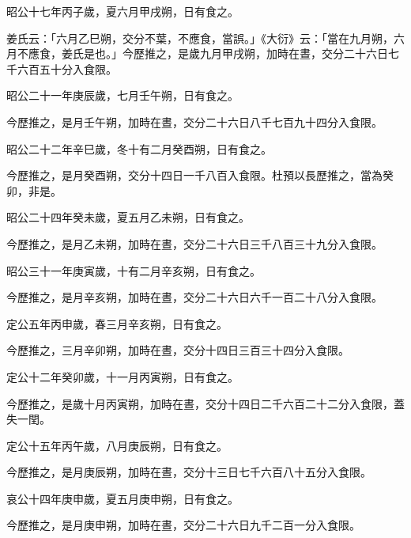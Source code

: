 \begin{pinyinscope}
 昭公十七年丙子歲，夏六月甲戌朔，日有食之。



 姜氏云：「六月乙巳朔，交分不葉，不應食，當誤。」《大衍》云：「當在九月朔，六月不應食，姜氏是也。」今歷推之，是歲九月甲戌朔，加時在晝，交分二十六日七千六百五十分入食限。



 昭公二十一年庚辰歲，七月壬午朔，日有食之。



 今歷推之，是月壬午朔，加時在晝，交分二十六日八千七百九十四分入食限。



 昭公二十二年辛巳歲，冬十有二月癸酉朔，日有食之。



 今歷推之，是月癸酉朔，交分十四日一千八百入食限。杜預以長歷推之，當為癸卯，非是。



 昭公二十四年癸未歲，夏五月乙未朔，日有食之。



 今歷推之，是月乙未朔，加時在晝，交分二十六日三千八百三十九分入食限。



 昭公三十一年庚寅歲，十有二月辛亥朔，日有食之。



 今歷推之，是月辛亥朔，加時在晝，交分二十六日六千一百二十八分入食限。



 定公五年丙申歲，春三月辛亥朔，日有食之。



 今歷推之，三月辛卯朔，加時在晝，交分十四日三百三十四分入食限。



 定公十二年癸卯歲，十一月丙寅朔，日有食之。



 今歷推之，是歲十月丙寅朔，加時在晝，交分十四日二千六百二十二分入食限，蓋失一閏。



 定公十五年丙午歲，八月庚辰朔，日有食之。



 今歷推之，是月庚辰朔，加時在晝，交分十三日七千六百八十五分入食限。



 哀公十四年庚申歲，夏五月庚申朔，日有食之。



 今歷推之，是月庚申朔，加時在晝，交分二十六日九千二百一分入食限。




\end{pinyinscope}
